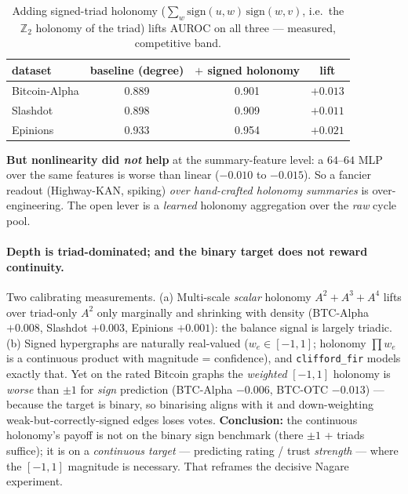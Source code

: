 \documentclass[11pt]{article}
\theoremstyle{definition}\newtheorem{remark}{Remark}
\begin{document}
\begin{table}[h]\centering\small
\begin{tabular}{lccc}
\toprule
dataset & baseline (degree) & $+$ signed holonomy & lift \\
\midrule
Bitcoin-Alpha & 0.889 & 0.901 & $+0.013$\\
Slashdot & 0.898 & 0.909 & $+0.011$\\
Epinions & 0.933 & 0.954 & $+0.021$\\
\bottomrule
\end{tabular}
\caption{Adding signed-triad holonomy ($\sum_w \mathrm{sign}(u,w)\,\mathrm{sign}(w,v)$,
i.e.\ the $\mathbb{Z}_2$ holonomy of the triad) lifts AUROC on all three ---
measured, competitive band.}
\end{table}

\noindent\textbf{But nonlinearity did \emph{not} help} at the summary-feature
level: a $64$--$64$ MLP over the same features is worse than linear
($-0.010$ to $-0.015$). So a fancier readout (Highway-KAN, spiking) \emph{over
hand-crafted holonomy summaries} is over-engineering. The open lever is a
\emph{learned} holonomy aggregation over the \emph{raw} cycle pool.

\paragraph{Depth is triad-dominated; and the binary target does not reward
continuity.} Two calibrating measurements. (a) Multi-scale \emph{scalar} holonomy
$A^2\!+\!A^3\!+\!A^4$ lifts over triad-only $A^2$ only marginally and shrinking
with density (BTC-Alpha $+0.008$, Slashdot $+0.003$, Epinions $+0.001$): the
balance signal is largely triadic. (b) Signed hypergraphs are naturally
real-valued ($w_e\in[-1,1]$; holonomy $\prod w_e$ is a continuous product with
magnitude = confidence), and \texttt{clifford\_fir} models exactly that. Yet on
the rated Bitcoin graphs the \emph{weighted} $[-1,1]$ holonomy is \emph{worse}
than $\pm1$ for \emph{sign} prediction (BTC-Alpha $-0.006$, BTC-OTC $-0.013$) ---
because the target is binary, so binarising aligns with it and down-weighting
weak-but-correctly-signed edges loses votes. \textbf{Conclusion:} the continuous
holonomy's payoff is not on the binary sign benchmark (there $\pm1$ + triads
suffice); it is on a \emph{continuous target} --- predicting rating / trust
\emph{strength} --- where the $[-1,1]$ magnitude is necessary. That reframes the
decisive Nagare experiment.
\end{document}
